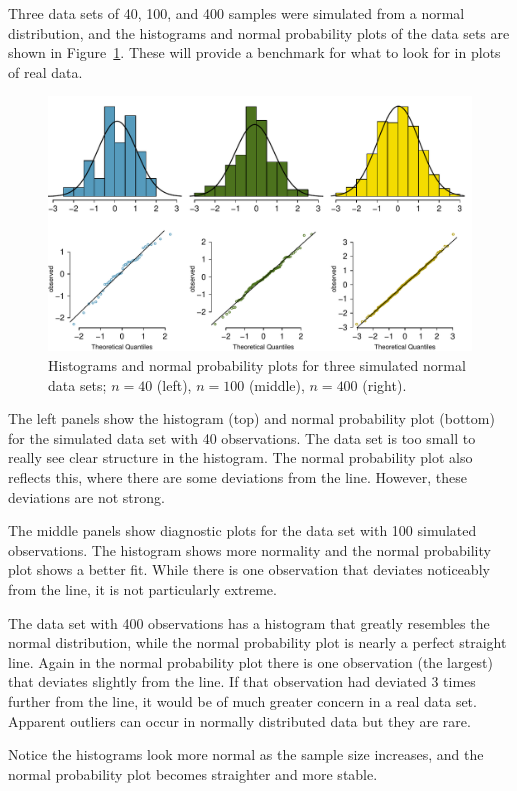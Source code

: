 \begin{example}{Three data sets of 40, 100, and 400 samples were simulated from a normal distribution, and the histograms and normal probability plots of the data sets are shown in Figure~\ref{normalExamples}. These will provide a benchmark for what to look for in plots of real data.} \label{normalExamplesExample}

\begin{figure}
\centering
\includegraphics[width=\textwidth]{ch_distributions/figures/normalExamples/normalExamples}
\caption{Histograms and normal probability plots for three simulated normal data sets; $n=40$ (left), $n=100$ (middle), $n=400$ (right).}
\label{normalExamples}
\end{figure}

The left panels show the histogram (top) and normal probability plot (bottom) for the simulated data set with 40 observations. The data set is too small to really see clear structure in the histogram. The normal probability plot also reflects this, where there are some deviations from the line. However, these deviations are not strong.

The middle panels show diagnostic plots for the data set with 100 simulated observations. The histogram shows more normality and the normal probability plot shows a better fit. While there is one observation that deviates noticeably from the line, it is not particularly extreme.

The data set with 400 observations has a histogram that greatly resembles the normal distribution, while the normal probability plot is nearly a perfect straight line. Again in the normal probability plot there is one observation (the largest) that deviates slightly from the line. If that observation had deviated 3 times further from the line, it would be of much greater concern in a real data set. Apparent outliers can occur in normally distributed data but they are rare.

Notice the histograms look more normal as the sample size increases, and the normal probability plot becomes straighter and more stable.
\end{example}

